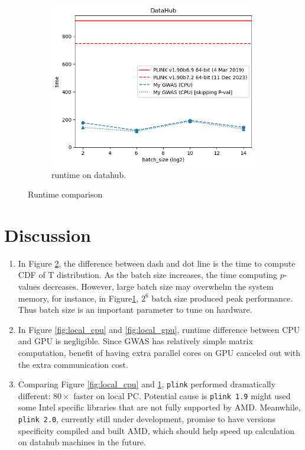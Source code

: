 \documentclass{article}
\begin{document}
\begin{figure}[h]
      \begin{subfigure}[b]{0.32\textwidth}
            \includegraphics[width=\textwidth]{../datahub.png}
            \caption{\label{fig:datahub}runtime on datahub.}
      \end{subfigure}
      
      \caption{\label{fig:runtime}Runtime comparison}
  \end{figure}


\section{Discussion}
\begin{enumerate}
\item In Figure \ref*{fig:runtime},
the difference between dash and dot line is the time to compute CDF of T distribution.
As the batch size increases, the time computing $p$-values decreases.
However, large batch size may overwhelm the system memory, 
for instance, in Figure\ref*{fig:datahub}, $2^6$ batch size produced peak performance.
Thus batch size is an important parameter to tune on hardware.

\item In Figure \ref*{fig:local_cpu} and \ref*{fig:local_gpu},
runtime difference between CPU and GPU is negligible.
Since GWAS has relatively simple matrix computation,
benefit of having extra parallel cores on GPU 
canceled out with the extra communication cost.

\item Comparing Figure \ref*{fig:local_cpu} and \ref*{fig:datahub},
\texttt{plink} performed dramatically different: $80\times$ faster on local PC.
Potential cause is \texttt{plink 1.9} might used some Intel specific libraries
that are not fully supported by AMD.
Meanwhile, \texttt{plink 2.0}, currently still under development, 
promise to have versions specificity compiled and built AMD, 
which should help speed up calculation on datahub machines in the future.

\end{enumerate}
\end{document}
